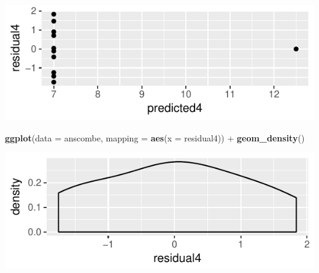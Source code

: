 \documentclass[]{article}
\newenvironment{Shaded}{\begin{snugshade}}{\end{snugshade}}
\newcommand{\KeywordTok}[1]{\textcolor[rgb]{0.13,0.29,0.53}{\textbf{{#1}}}}
\newcommand{\DataTypeTok}[1]{\textcolor[rgb]{0.13,0.29,0.53}{{#1}}}
\newcommand{\StringTok}[1]{\textcolor[rgb]{0.31,0.60,0.02}{{#1}}}
\newcommand{\NormalTok}[1]{{#1}}
\begin{document}
\begin{Shaded}
\end{Shaded}

\includegraphics{20180417_anscombe_residuals_files/figure-latex/unnamed-chunk-13-1.pdf}

\begin{Shaded}
\begin{Highlighting}[]
\KeywordTok{ggplot}\NormalTok{(}\DataTypeTok{data =} \NormalTok{anscombe, }\DataTypeTok{mapping =} \KeywordTok{aes}\NormalTok{(}\DataTypeTok{x =} \NormalTok{residual4)) +}
\StringTok{  }\KeywordTok{geom_density}\NormalTok{()}
\end{Highlighting}
\end{Shaded}

\includegraphics{20180417_anscombe_residuals_files/figure-latex/unnamed-chunk-14-1.pdf}
\end{document}
